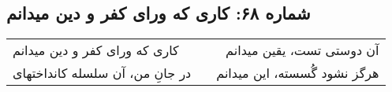\begin{center}
\section*{شماره ۶۸: کاری که ورای کفر و دین میدانم}
\label{sec:068}
\begin{longtable}{l p{0.5cm} r}
کاری که ورای کفر و دین میدانم
&&
آن دوستی تست، یقین میدانم
\\
در جانِ من، آن سلسله کانداختهای
&&
هرگز نشود گُسسته، این میدانم
\\
\end{longtable}
\end{center}
